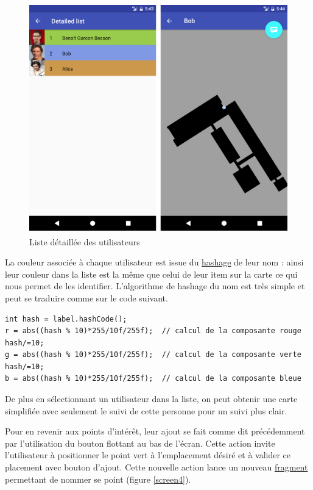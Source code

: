 \begin{figure}[H]
    \centering
    \includegraphics[height=10cm]{./img/screen3.png}
    \caption{Liste détaillée des utilisateurs}
    \label{screen3}
\end{figure}

La couleur associée à chaque utilisateur est issue du \underline{hashage} de leur nom : ainsi leur couleur dans la liste est la même que celui de leur item sur la carte ce qui nous permet de les identifier. L’algorithme de hashage du nom est très simple et peut se traduire comme sur le code suivant.

\lstset{language=Java}
\begin{lstlisting}[caption=Hashage du nom en couleur]
int hash = label.hashCode();
r = abs((hash % 10)*255/10f/255f);	// calcul de la composante rouge
hash/=10;
g = abs((hash % 10)*255/10f/255f); 	// calcul de la composante verte
hash/=10;
b = abs((hash % 10)*255/10f/255f); 	// calcul de la composante bleue
\end{lstlisting}

De plus en sélectionnant un utilisateur dans la liste, on peut obtenir une carte simplifiée avec seulement le suivi de cette personne pour un suivi plus clair.

Pour en revenir aux points d’intérêt, leur ajout se fait comme dit précédemment par l’utilisation du bouton flottant au bas de l’écran. Cette action invite l’utilisateur à positionner le point vert à l’emplacement désiré et à valider ce placement avec bouton d’ajout. Cette nouvelle action lance un nouveau \underline{fragment} permettant de nommer se point (figure \ref{screen4}).


